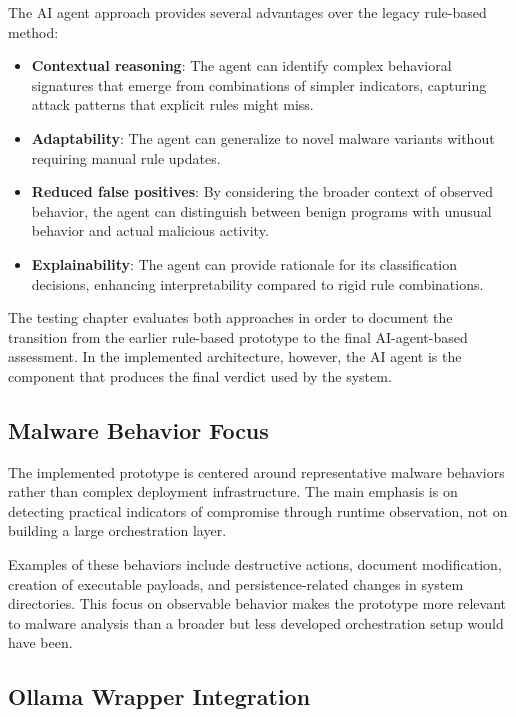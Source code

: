 \vspace{1em}
 
The AI agent approach provides several advantages over the legacy rule-based method:
\begin{itemize}
    \item \textbf{Contextual reasoning}: The agent can identify complex behavioral signatures that emerge from combinations of simpler indicators, capturing attack patterns that explicit rules might miss.
    \item \textbf{Adaptability}: The agent can generalize to novel malware variants without requiring manual rule updates.
    \item \textbf{Reduced false positives}: By considering the broader context of observed behavior, the agent can distinguish between benign programs with unusual behavior and actual malicious activity.
    \item \textbf{Explainability}: The agent can provide rationale for its classification decisions, enhancing interpretability compared to rigid rule combinations.
\end{itemize}
 
\noindent
The testing chapter evaluates both approaches in order to document the transition from the earlier rule-based prototype to the final AI-agent-based assessment. In the implemented architecture, however, the AI agent is the component that produces the final verdict used by the system.
 
\subsection{Malware Behavior Focus}
\noindent
The implemented prototype is centered around representative malware behaviors rather than complex deployment infrastructure. The main emphasis is on detecting practical indicators of compromise through runtime observation, not on building a large orchestration layer.
 
\vspace{1em}
 
Examples of these behaviors include destructive actions, document modification, creation of executable payloads, and persistence-related changes in system directories. This focus on observable behavior makes the prototype more relevant to malware analysis than a broader but less developed orchestration setup would have been.

\subsection{Ollama Wrapper Integration}

